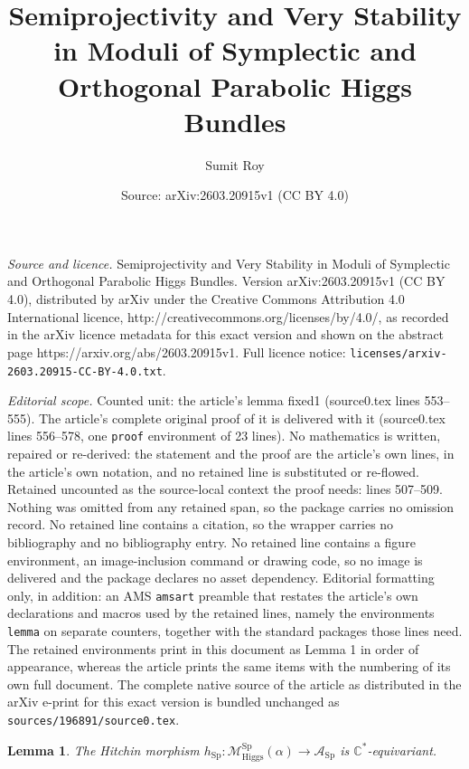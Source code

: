 \documentclass[10pt,a4paper]{amsart}
\title{Semiprojectivity and Very Stability in Moduli of Symplectic and Orthogonal Parabolic Higgs Bundles}
\author{Sumit Roy}
\date{Source: arXiv:2603.20915v1 (CC BY 4.0)}
\newtheorem{lemma}{Lemma}
\begin{document}
\maketitle

\noindent\emph{Source and licence.} Semiprojectivity and Very Stability in Moduli of Symplectic and Orthogonal Parabolic Higgs Bundles. Version arXiv:2603.20915v1 (CC BY 4.0), distributed by arXiv under the Creative Commons Attribution 4.0 International licence, http://creativecommons.org/licenses/by/4.0/, as recorded in the arXiv licence metadata for this exact version and shown on the abstract page https://arxiv.org/abs/2603.20915v1. Full licence notice: \texttt{licenses/arxiv-2603.20915-CC-BY-4.0.txt}.\par\smallskip

\noindent\textit{Editorial scope.} Counted unit: the article's lemma fixed1 (source0.tex lines 553--555). The article's complete original proof of it is delivered with it (source0.tex lines 556--578, one \texttt{proof} environment of 23 lines). No mathematics is written, repaired or re-derived: the statement and the proof are the article's own lines, in the article's own notation, and no retained line is substituted or re-flowed.  Retained uncounted as the source-local context the proof needs: lines 507--509.  Nothing was omitted from any retained span, so the package carries no omission record.  No retained line contains a citation, so the wrapper carries no bibliography and no bibliography entry.  No retained line contains a figure environment, an image-inclusion command or drawing code, so no image is delivered and the package declares no asset dependency.  Editorial formatting only, in addition: an AMS \texttt{amsart} preamble that restates the article's own declarations and macros used by the retained lines, namely the environments \texttt{lemma} on separate counters, together with the standard packages those lines need.  The retained environments print in this document as Lemma 1 in order of appearance, whereas the article prints the same items with the numbering of its own full document.  The complete native source of the article as distributed in the arXiv e-print for this exact version is bundled unchanged as \texttt{sources/196891/source0.tex}.
\begin{lemma}\label{equivariant}
    The Hitchin morphism $h_{\mathrm{Sp}} : \mathcal{M}^{\mathrm{Sp}}_{\mathrm{Higgs}}(\alpha) \rightarrow \mathcal{A}_{\mathrm{Sp}}$ is $\mathbb{C}^*$-equivariant.
\end{lemma}
\end{document}
